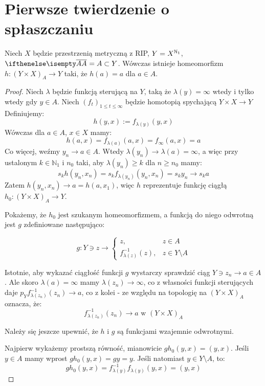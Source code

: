 \section{Pierwsze twierdzenie o spłaszczaniu}
\begin{thm}
  Niech $X$ będzie przestrzenią metryczną z RIP, $Y = X^{\mathbb{N}_1}$, $\cl A = A \subset Y$. Wówczas istnieje homeomorfizm $h: (Y \times X)_A \rightarrow Y$ taki, że $h(a) = a$ dla $a \in A$.
  
  \begin{proof}
    Niech $\lambda$ będzie funkcją sterującą na $Y$, taką że $\lambda(y) = \infty$ wtedy i tylko wtedy gdy $y \in A$.
    Niech $(f_t)_{1 \leq t \leq \infty}$ będzie homotopią spychającą $Y \times X \rightarrow Y$
    Definiujemy:
    \[h(y,x) := f_{\lambda(y)}(y,x)\]
    Wówczas dla $a \in A$, $x \in X$ mamy:
    \[h(a,x) = f_{\lambda(a)}(a,x) = f_\infty(a,x) = a\]
    Co więcej, weźmy $y_n \rightarrow a \in A$. Wtedy $\lambda(y_n) \rightarrow \lambda(a) = \infty$, a więc przy ustalonym $k \in \mathbb{N}_1$ i $n_0$ taki, aby $\lambda(y_n) \geq k$ dla $n \geq n_0$ mamy:
    \[s_k h(y_n, x_n) = s_k f_{\lambda(y_n)}(y_n,x_n) = s_k y_n \rightarrow s_k a\]
    Zatem $h(y_n,x_n) \rightarrow a = h(a, x_1)$, więc $h$ reprezentuje funkcję ciągłą $h_0: (Y \times X)_A \rightarrow Y$.
    
    Pokażemy, że $h_0$ jest szukanym homeomorfizmem, a funkcją do niego odwrotną jest $g$ zdefiniowane następująco:
    
    \[g: Y \ni z \rightarrow
    \begin{cases}
      z,& z\in A \\
      f^{-1}_{\lambda(z)}(z),& z \in Y \setminus A
    \end{cases}\]
    
    Istotnie, aby wykazać ciągłość funkcji $g$ wystarczy sprawdzić ciąg $Y \ni z_n \rightarrow a \in A$. Ale skoro $\lambda(a) = \infty$ mamy $\lambda(z_n) \rightarrow \infty$, co z własności funkcji sterujących daje $p_Y f_{\lambda(z_n)}^{-1}(z_n) \rightarrow a$, co z kolei - ze względu na topologię na $(Y \times X)_A$ oznacza, że:
    \[f_{\lambda(z_n)}^{-1}(z_n) \rightarrow a \mbox{ w } (Y \times X)_A\]

    Należy się jeszcze upewnić, że $h$ i $g$ są funkcjami wzajemnie odwrotnymi.
    
    Najpierw wykażemy prostszą równość, mianowicie $gh_0(y,x) = (y,x)$. Jeśli $y \in A$ mamy wprost $gh_0(y,x) = gy = y$. Jeśli natomiast $y \in Y \setminus A$, to:
    \[gh_0(y,x) = f^{-1}_{\lambda(y)} f_{\lambda(y)}(y,x) = (y,x)\]
    

\end{proof}
\end{thm}
